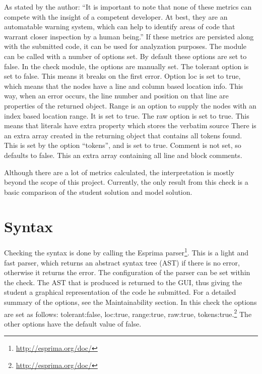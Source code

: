 As stated by the author: ``It is important to note that none of these metrics can compete with the insight of a competent developer. At best, they are an automatable warning system, which can help to identify areas of code that warrant closer inspection by a human being.''
If these metrics are persisted along with the submitted code, it can be used for
analyzation purposes. The module can be called with a number of options set.
By default these options are set to false.
In the \gls{check} module, the options are manually set.
The tolerant option is set to false. This means it breaks on the first error.
Option loc is set to true, which means that the nodes have a line and column based location info.
This way, when an error occurs, the line number and position on that line are properties of the returned object.
Range is an option to supply the nodes with an index based location range. It is set to true.
The raw option is set to true. This means that literals have extra property which stores the verbatim source
There is an extra array created in the returning object that contains all tokens found.
This is set by the option ``tokens'', and is set to true.
Comment is not set, so defaults to false.
This an extra array containing all line and block comments.

Although there are a lot of metrics calculated, the interpretation is mostly
beyond the scope of this project. Currently, the only result from this check is
a basic comparison of the \gls{student} \gls{solution} and model \gls{solution}.

\section{Syntax}
Checking the syntax is done by calling the Esprima 
parser\footnote{\url{http://esprima.org/doc/}}. This is a light and fast parser, 
which returns an abstract syntax tree (AST) if there is no error, otherwise it returns
the error. The configuration of the parser can be set within the check.
The AST that is produced is returned to the GUI, thus giving the \gls{student} a
graphical representation of the code he submitted.
For a detailed summary of the options, see the Maintainability section.
In this \gls{check} the options are set as follows: tolerant:false, loc:true,
range:true, raw:true, tokens:true.\footnote{\url{http://esprima.org/doc/}}
The other options have the default value of false.


